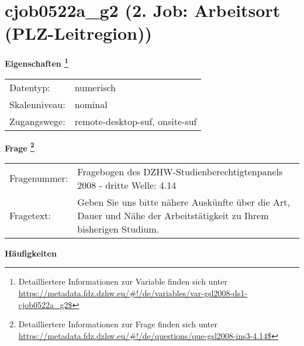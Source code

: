 
    \setcounter{footnote}{0}

    \vspace*{-1.8cm}
	\section{cjob0522a\_g2 (2. Job: Arbeitsort (PLZ-Leitregion))}
	\label{section:cjob0522a_g2}



    \vspace*{0.5cm}
    \noindent\textbf{Eigenschaften
	\footnote{Detailliertere Informationen zur Variable finden sich unter
		\url{https://metadata.fdz.dzhw.eu/\#!/de/variables/var-gsl2008-ds1-cjob0522a_g2$}}}\\
	\begin{tabularx}{\hsize}{@{}lX}
	Datentyp: & numerisch \\
	Skalenniveau: & nominal \\
	Zugangswege: &
	  remote-desktop-suf, 
	  onsite-suf
 \\
    \end{tabularx}



				\vspace*{0.5cm}
                \noindent\textbf{Frage
	                \footnote{Detailliertere Informationen zur Frage finden sich unter
		              \url{https://metadata.fdz.dzhw.eu/\#!/de/questions/que-gsl2008-ins3-4.14$}}}\\
				\begin{tabularx}{\hsize}{@{}lX}
					Fragenummer: &
					  Fragebogen des DZHW-Studienberechtigtenpanels 2008 - dritte Welle:
					  4.14
 \\
					Fragetext: & Geben Sie uns bitte nähere Auskünfte über die Art, Dauer und Nähe der Arbeitstätigkeit zu Ihrem bisherigen Studium. \\
				\end{tabularx}





        		\vspace*{0.5cm}
                \noindent\textbf{Häufigkeiten}

